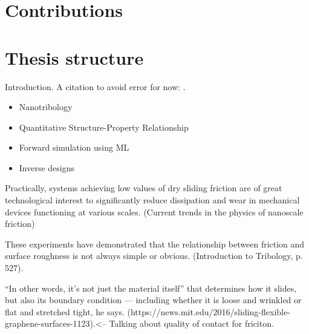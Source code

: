 \section{Contributions}

\section{Thesis structure }

\newpage
Introduction. A citation to avoid error for now: \cite{li_evolving_2016}.

\begin{itemize}
    \item Nanotribology
    \item Quantitative Structure-Property Relationship
    \item Forward simulation using ML
    \item Inverse designs
\end{itemize}


Practically, systems achieving low values of dry sliding friction are of great technological interest to significantly reduce dissipation and wear in mechanical devices functioning at various scales. (Current trends in the physics of nanoscale friction)

These experiments have demonstrated that the relationship between friction and surface roughness is not always simple or obvious. (Introduction to Tribology, p. 527).


“In other words, it’s not just the material itself” that determines how it slides, but also its boundary condition — including whether it is loose and wrinkled or flat and stretched tight, he says. (https://news.mit.edu/2016/sliding-flexible-graphene-surfaces-1123).<-- Talking about quality of contact for friciton.